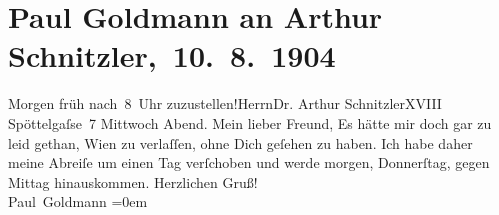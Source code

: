 

         
         \renewcommand{\erwaehntePersonen}{Personen: Paul Goldmann}
         \renewcommand{\erwaehnteOrte}{Orte: Edmund-Weiß-Gasse 7, Wien, XVIII., Währing}
         \renewcommand{\erwaehnteWerke}{}
               \section[ Paul Goldmann an Arthur Schnitzler, 10. 8. 1904]{ Paul Goldmann an Arthur Schnitzler, 10. 8. 1904}\nopagebreak{}\rehead{ }\begin{ledgroupsized}[t]{13cm}\normalsize\beginnumbering{} \toendnotes[C]{\smallbreak\pagebreak[2]} 
\toendnotes[C]{\smallbreak}\pstart{}{\pb}Morgen{ }früh nach 8 Uhr zuzustellen!\pend{}\pstart{}Herrn\pend{}\pstart{}Dr. Arthur Schnitzler\pend{}\pstart{}XVIII Spöttelgaſse 7\pend{}{\bigskip}\pstart
           {\pb}Mittwoch{ }Abend.\pend
           \pstart{}Mein lieber Freund,\pend\pstart
           Es hätte mir doch gar zu leid gethan, Wien zu
               verlaſſen, ohne Dich geſehen zu haben. Ich habe daher meine Abreiſe um einen Tag
               verſchoben und werde morgen, Donnerſtag, gegen
                  Mittag{ }\label{K_L03450-1v}\label{K_L03450-1h} hinauskommen.\pend
           \pstart
           Herzlichen Gruß! {\\[\baselineskip]}\spacefill\mbox{Paul Goldmann}\pend
           \leftskip=0em{}
         
         \endnumbering{}\end{ledgroupsized}  \newcommand{\dateiname}{L03450}\newcommand{\titel}{Paul Goldmann an Arthur Schnitzler, 10. 8. 1904}\newcommand{\editorInnen}{Martin Anton Müller und Laura Untner}
      